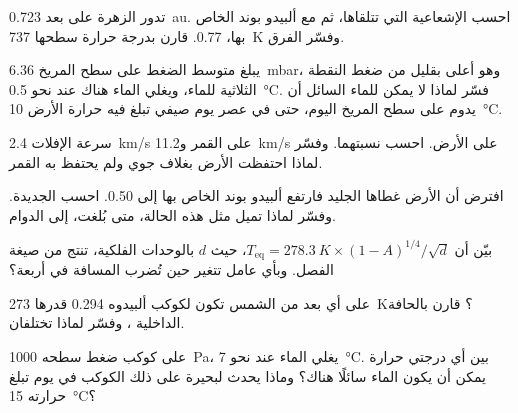 \begin{exercise}[$\star\star$]\label{exo:g10:habitable-planet:8}
تدور الزهرة على بعد \qty{0.723}{au}. احسب الإشعاعية التي تتلقاها، ثم  مع ألبيدو بوند الخاص بها، 0.77. قارن بدرجة حرارة سطحها
\qty{737}{K} وفسّر الفرق.
\end{exercise}

\begin{exercise}[$\star\star$]\label{exo:g10:habitable-planet:9}
يبلغ متوسط الضغط على سطح المريخ \qty{6.36}{mbar}، وهو أعلى بقليل من ضغط النقطة
الثلاثية للماء، ويغلي الماء هناك عند نحو \qty{0.5}{\degreeCelsius}. فسّر لماذا
لا يمكن للماء السائل أن يدوم على سطح المريخ اليوم، حتى في عصر يوم صيفي تبلغ فيه
حرارة الأرض \qty{10}{\degreeCelsius}.
\end{exercise}

\begin{exercise}[$\star\star$]\label{exo:g10:habitable-planet:10}
سرعة الإفلات \qty{2.4}{km/s} على القمر و\qty{11.2}{km/s} على
الأرض. احسب نسبتهما. وفسّر لماذا احتفظت الأرض بغلاف جوي ولم يحتفظ به
القمر.
\end{exercise}

\begin{exercise}[$\star\star$]\label{exo:g10:habitable-planet:11}
افترض أن الأرض غطاها الجليد فارتفع ألبيدو بوند الخاص بها إلى 0.50.
احسب  الجديدة. وفسّر لماذا تميل مثل هذه الحالة، متى بُلغت،
إلى الدوام.
\end{exercise}

\begin{exercise}[$\star\star\star$]\label{exo:g10:habitable-planet:12}
بيّن أن $T_{\mathrm{eq}} = \qty{278.3}{K} \times (1-A)^{1/4}/\sqrt{d}$، حيث
$d$ بالوحدات الفلكية، تنتج من صيغة الفصل. وبأي عامل تتغير 
حين تُضرب المسافة في أربعة؟
\end{exercise}

\begin{exercise}[$\star\star\star$]\label{exo:g10:habitable-planet:13}
على أي بعد من الشمس تكون لكوكب ألبيدوه 0.294  قدرها
\qty{273}{K}؟ قارن بالحافة الداخلية ، وفسّر لماذا
تختلفان.
\end{exercise}

\begin{exercise}[$\star\star\star$]\label{exo:g10:habitable-planet:14}
على كوكب ضغط سطحه \qty{1000}{Pa}، يغلي الماء عند نحو
\qty{7}{\degreeCelsius}. بين أي درجتي حرارة يمكن أن يكون الماء سائلًا هناك؟
وماذا يحدث لبحيرة على ذلك الكوكب في يوم تبلغ حرارته
\qty{15}{\degreeCelsius}؟
\end{exercise}

